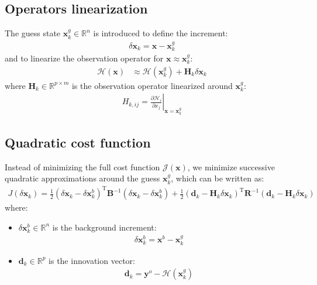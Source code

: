 \documentclass[12pt]{scrartcl}
\begin{document}
\subsection{Operators linearization}
The guess state $\mathbf{x}^g_k \in \mathbb{R}^n$ is introduced to define the increment:
\begin{align}
\delta \mathbf{x}_k =  \mathbf{x}-\mathbf{x}^g_k
\end{align}
and to linearize the observation operator for $\mathbf{x} \approx \mathbf{x}^g_k$:
\begin{align}
\label{eq:linearize}
\mathcal{H}(\mathbf{x}) & \approx \mathcal{H}(\mathbf{x}^g_k) + \mathbf{H}_k \delta \mathbf{x}_k
\end{align}
where $\mathbf{H}_k \in \mathbb{R}^{p \times m}$ is the observation operator linearized around $\mathbf{x}^g_k$:
\begin{align}
H_{k,ij} = \left.\frac{\partial \mathcal{H}_i}{\partial x_j}\right|_{\mathbf{x} = \mathbf{x}^g_k}
\end{align}

\subsection{Quadratic cost function}
Instead of minimizing the full cost function $\mathcal{J}(\mathbf{x})$, we minimize successive quadratic approximations around the guess $\mathbf{x}^g_k$, which can be written as:
\begin{align}
\label{eq:cost_quad}
J \left(\delta \mathbf{x}_k\right) = \frac{1}{2} \left(\delta \mathbf{x}_k-\delta \mathbf{x}^b_k\right)^\mathrm{T} \mathbf{B}^{-1} \left(\delta \mathbf{x}_k-\delta \mathbf{x}^b_k\right) + \frac{1}{2} \left(\mathbf{d}_k - \mathbf{H}_k \delta \mathbf{x}_k\right)^\mathrm{T} \mathbf{R}^{-1} \left(\mathbf{d}_k - \mathbf{H}_k \delta \mathbf{x}_k\right)
\end{align}
where:
\begin{itemize}
\item $\delta \mathbf{x}^b_k  \in \mathbb{R}^n$ is the background increment:
\begin{align}
\delta \mathbf{x}^b_k = \mathbf{x}^b - \mathbf{x}^g_k
\end{align}
\item $\mathbf{d}_k \in \mathbb{R}^p$ is the innovation vector:
\begin{align}
\mathbf{d}_k = \mathbf{y}^o - \mathcal{H}(\mathbf{x}^g_k)
\end{align}
\end{itemize}
\end{document}
